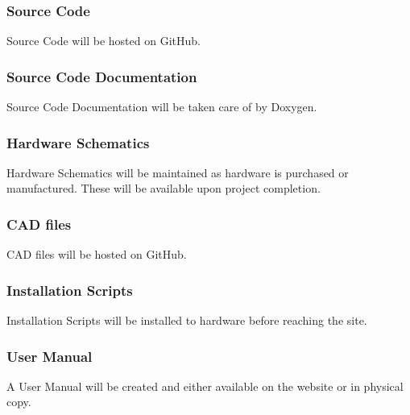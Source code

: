 \subsubsection{Source Code}
\quad \quad Source Code will be hosted on GitHub.

\subsubsection{Source Code Documentation}
\quad \quad Source Code Documentation will be taken care of by Doxygen.

\subsubsection{Hardware Schematics}
\quad \quad Hardware Schematics will be maintained as hardware is purchased or manufactured. 
These will be available upon project completion.

\subsubsection{CAD files}
\quad \quad CAD files will be hosted on GitHub.

\subsubsection{Installation Scripts}
\quad \quad Installation Scripts will be installed to hardware before reaching the site.

\subsubsection{User Manual}
\quad \quad A User Manual will be created and either available on the website or in physical copy.